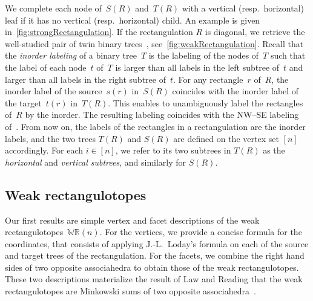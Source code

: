 \documentclass{amsart}
\newtheorem{lemma}[theorem]{Lemma}
\theoremstyle{definition}
\newcommand{\darkblue}{\color{darkblue}} %
\newcommand{\defn}[1]{\textsl{\darkblue #1}} %
\newcommand{\polytope}[1]{\mathds{#1}} %
\newcommand{\WRP}{\polytope{WR}} %
\begin{document}

We complete each node of~$S(R)$ and~$T(R)$ with a vertical (resp.~horizontal) leaf if it has no vertical (resp.~horizontal) child.
An example is given in~\cref{fig:strongRectangulation}.
If the rectangulation $R$ is diagonal, we retrieve the well-studied pair of twin binary trees~\cite{MR1417289,MR2914637}, see~\cref{fig:weakRectangulation}.
Recall that the \defn{inorder labeling} of a binary tree~$T$ is the labeling of the nodes of~$T$ such that the label of each node~$t$ of~$T$ is larger than all labels in the left subtree of~$t$ and larger than all labels in the right subtree of~$t$.
For any rectangle~$r$ of~$R$, the inorder label of the source~$s(r)$ in~$S(R)$ coincides with the inorder label of the target~$t(r)$ in~$T(R)$.
This enables to unambiguously label the rectangles of~$R$ by the inorder.
The resulting labeling coincides with the NW--SE labeling of~\cite{ACFF24}.
From now on, the labels of the rectangles in a rectangulation are the inorder labels, and the two trees $T(R)$ and $S(R)$ are defined on the vertex set $[n]$ accordingly.
For each $i\in [n]$, we refer to its two subtrees in $T(R)$ as the \defn{horizontal} and \defn{vertical subtrees}, and similarly for $S(R)$.


\subsection{Weak rectangulotopes}
\label{subsec:weakRectangulotopes}

Our first results are simple vertex and facet descriptions of the weak rectangulotopes~$\WRP(n)$.
For the vertices, we provide a concise formula for the coordinates, that consists of applying J.-L.~Loday's formula on each of the source and target trees of the rectangulation.
For the facets, we combine the right hand sides of two opposite associahedra to obtain those of the weak rectangulotopes.
These two descriptions materialize the result of Law and Reading that the weak rectangulotopes are Minkowski sums of two opposite associahedra~\cite{MR2871762}.
\end{document}
